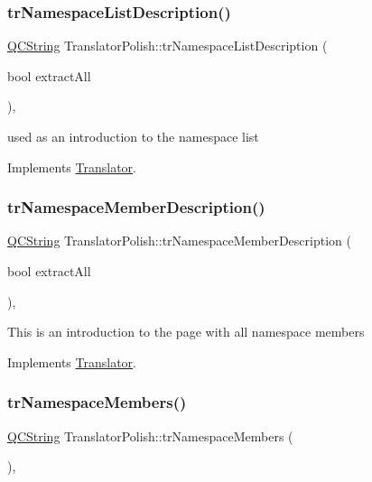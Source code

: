 \subsubsection{\texorpdfstring{trNamespaceListDescription()}{trNamespaceListDescription()}}
{\footnotesize\ttfamily \mbox{\hyperlink{class_q_c_string}{Q\+C\+String}} Translator\+Polish\+::tr\+Namespace\+List\+Description (\begin{DoxyParamCaption}\item[{bool}]{extract\+All }\end{DoxyParamCaption})\hspace{0.3cm}{\ttfamily [inline]}, {\ttfamily [virtual]}}

used as an introduction to the namespace list 

Implements \mbox{\hyperlink{class_translator}{Translator}}.

\mbox{\label{class_translator_polish_a2d92c886d795fc270e91223ac0bc6984}} 
\subsubsection{\texorpdfstring{trNamespaceMemberDescription()}{trNamespaceMemberDescription()}}
{\footnotesize\ttfamily \mbox{\hyperlink{class_q_c_string}{Q\+C\+String}} Translator\+Polish\+::tr\+Namespace\+Member\+Description (\begin{DoxyParamCaption}\item[{bool}]{extract\+All }\end{DoxyParamCaption})\hspace{0.3cm}{\ttfamily [inline]}, {\ttfamily [virtual]}}

This is an introduction to the page with all namespace members 

Implements \mbox{\hyperlink{class_translator}{Translator}}.

\mbox{\label{class_translator_polish_a42107865ec985e1f36ee2f251cba3760}} 
\subsubsection{\texorpdfstring{trNamespaceMembers()}{trNamespaceMembers()}}
{\footnotesize\ttfamily \mbox{\hyperlink{class_q_c_string}{Q\+C\+String}} Translator\+Polish\+::tr\+Namespace\+Members (\begin{DoxyParamCaption}{ }\end{DoxyParamCaption})\hspace{0.3cm}{\ttfamily [inline]}, {\ttfamily [virtual]}}

